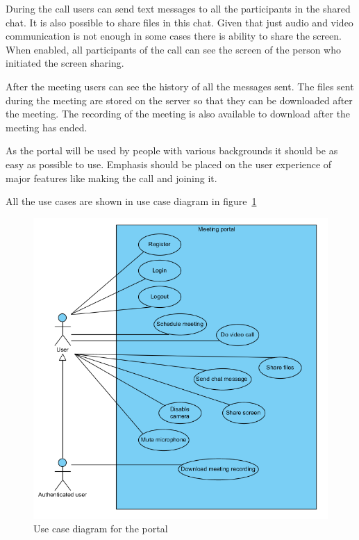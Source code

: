 \documentclass[
  digital, %
  table,   %
  lof,     %
  nolot,     %
]{fithesis3}
\begin{document}
During the call users can send text messages to all the participants in the shared chat. It is also possible to share files in this chat. Given that just audio and video communication is not enough in some cases there is ability to share the screen. When enabled, all participants of the call can see the screen of the person who initiated the screen sharing. 

After the meeting users can see the history of all the messages sent. The files sent during the meeting are stored on the server so that they can be downloaded after the meeting. The recording of the meeting is also available to download after the meeting has ended.

As the portal will be used by people with various backgrounds it should be as easy as possible to use. Emphasis should be placed on the user experience of major features like making the call and joining it.

All the use cases are shown in use case diagram in figure~\ref{fig:useCase}

\begin{figure}
  \begin{center}
    \includegraphics[scale=0.7]{diagrams/use_case.png}
  \end{center}
  \caption{Use case diagram for the portal}
  \label{fig:useCase}
\end{figure}
\end{document}
